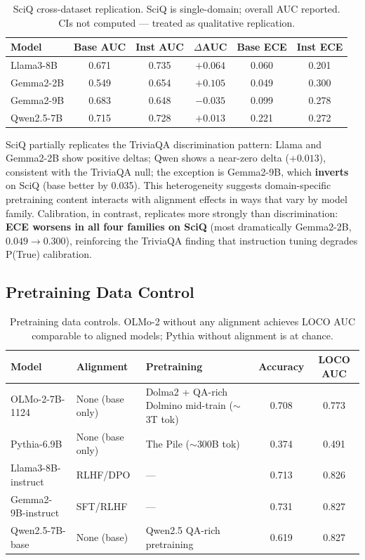 \documentclass[11pt]{article}
\begin{document}
\begin{table}[h]
\centering
\begin{tabular}{lccccc}
\toprule
Model & Base AUC & Inst AUC & $\Delta$AUC & Base ECE & Inst ECE \\
\midrule
Llama3-8B  & 0.671 & 0.735 & $+0.064$ & 0.060 & 0.201 \\
Gemma2-2B  & 0.549 & 0.654 & $+0.105$ & 0.049 & 0.300 \\
Gemma2-9B  & 0.683 & 0.648 & $-0.035$ & 0.099 & 0.278 \\
Qwen2.5-7B & 0.715 & 0.728 & $+0.013$ & 0.221 & 0.272 \\
\bottomrule
\end{tabular}
\caption{SciQ cross-dataset replication. SciQ is single-domain; overall AUC reported. CIs not computed --- treated as qualitative replication.}
\label{tab:sciq}
\end{table}

SciQ partially replicates the TriviaQA discrimination pattern: Llama and Gemma2-2B show positive deltas; Qwen shows a near-zero delta ($+0.013$), consistent with the TriviaQA null; the exception is Gemma2-9B, which \textbf{inverts} on SciQ (base better by 0.035). This heterogeneity suggests domain-specific pretraining content interacts with alignment effects in ways that vary by model family. Calibration, in contrast, replicates more strongly than discrimination: \textbf{ECE worsens in all four families on SciQ} (most dramatically Gemma2-2B, $0.049 \to 0.300$), reinforcing the TriviaQA finding that instruction tuning degrades P(True) calibration.

\subsection{Pretraining Data Control}

\begin{table}[h]
\centering
\small
\begin{tabular}{lllcc}
\toprule
Model & Alignment & Pretraining & Accuracy & LOCO AUC \\
\midrule
OLMo-2-7B-1124      & None (base only) & Dolma2 + QA-rich Dolmino mid-train (${\sim}$3T tok) & 0.708 & 0.773 \\
Pythia-6.9B         & None (base only) & The Pile (${\sim}$300B tok)                         & 0.374 & 0.491 \\
Llama3-8B-instruct  & RLHF/DPO         & ---                                                 & 0.713 & 0.826 \\
Gemma2-9B-instruct  & SFT/RLHF         & ---                                                 & 0.731 & 0.827 \\
Qwen2.5-7B-base     & None (base)      & Qwen2.5 QA-rich pretraining                         & 0.619 & 0.827 \\
\bottomrule
\end{tabular}
\caption{Pretraining data controls. OLMo-2 without any alignment achieves LOCO AUC comparable to aligned models; Pythia without alignment is at chance.}
\label{tab:pretrain}
\end{table}
\end{document}
